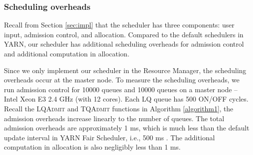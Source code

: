 

\subsubsection{Scheduling overheads}

Recall from Section \ref{sec:impl} that the \name scheduler has three components: user input, admission control, and allocation.
Compared to the default schedulers in YARN, our scheduler has additional scheduling overheads for admission control and additional computation in allocation.

Since we only implement our scheduler in the Resource Manager, the scheduling overheads occur at the master node.
To measure the scheduling overheads, we run admission control for 10000 \burstq queues and 10000 \batchq queues on a master node -- Intel Xeon E3 2.4 GHz (with 12 cores).
Each LQ queue has 500 ON/OFF cycles.
Recall the \textsc{LQAdmit} and \textsc{TQAdmit} functions in Algorithm \ref{algorithm1}, the admission overheads increase linearly to the number of queues.
The total admission overheads are approximately 1 ms, which is much less than the default update interval in YARN Fair Scheduler, i.e., 500 ms \cite{hadoop-fair-scheduler}.
The additional computation in allocation is also negligibly less than 1 ms.

